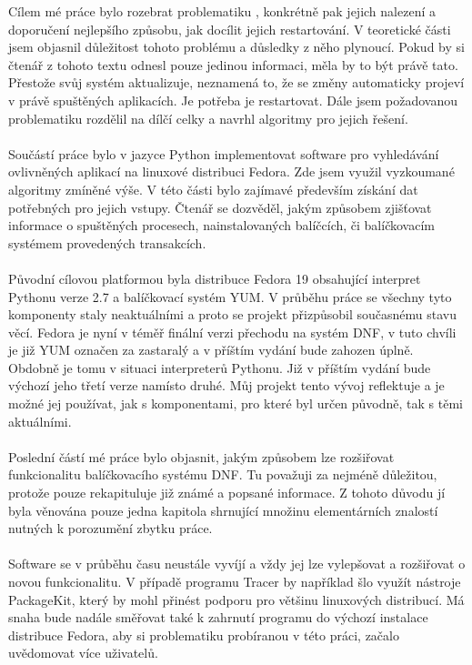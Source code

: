 \documentclass[
  field=inf,
  biblatex,
  glossaries,
  index
]{kidiplom}
\begin{document}
\begin{kiconclusions}
	Cílem mé práce bylo rozebrat problematiku , konkrétně pak jejich nalezení a doporučení nejlepšího způsobu, jak docílit jejich restartování. V teoretické části jsem objasnil důležitost tohoto problému a důsledky z něho plynoucí. Pokud by si čtenář z tohoto textu odnesl pouze jedinou informaci, měla by to být právě tato. Přestože svůj systém aktualizuje, neznamená to, že se změny automaticky projeví v právě spuštěných aplikacích. Je potřeba je restartovat. Dále jsem požadovanou problematiku rozdělil na dílčí celky a navrhl algoritmy pro jejich řešení.
	\\
	\\
	Součástí práce bylo v jazyce Python implementovat software pro vyhledávání ovlivněných aplikací na linuxové distribuci Fedora. Zde jsem využil vyzkoumané algoritmy zmíněné výše. V této části bylo zajímavé především získání dat potřebných pro jejich vstupy. Čtenář se dozvěděl, jakým způsobem zjišťovat informace o spuštěných procesech, nainstalovaných balíčcích, či balíčkovacím systémem provedených transakcích.
	\\
	\\
	Původní cílovou platformou byla distribuce Fedora 19 obsahující interpret Pythonu verze 2.7 a balíčkovací systém YUM. V průběhu práce se všechny tyto komponenty staly neaktuálními a proto se projekt přizpůsobil současnému stavu věcí. Fedora je nyní v téměř finální verzi přechodu na systém DNF, v tuto chvíli je již YUM označen za zastaralý a v příštím vydání bude zahozen úplně. Obdobně je tomu v situaci interpreterů Pythonu. Již v příštím vydání bude výchozí jeho třetí verze namísto druhé. Můj projekt tento vývoj reflektuje a je možné jej používat, jak s komponentami, pro které byl určen původně, tak s těmi aktuálními.
	\\
	\\
	Poslední částí mé práce bylo objasnit, jakým způsobem lze rozšiřovat funkcionalitu balíčkovacího systému DNF. Tu považuji za nejméně důležitou, protože pouze rekapituluje již známé a popsané informace. Z tohoto důvodu jí byla věnována pouze jedna kapitola shrnující množinu elementárních znalostí nutných k porozumění zbytku práce.
	\\
	\\
	Software se v průběhu času neustále vyvíjí a vždy jej lze vylepšovat a rozšiřovat o novou funkcionalitu. V případě programu Tracer by například šlo využít nástroje PackageKit, který by mohl přinést podporu pro většinu linuxových distribucí. Má snaha bude nadále směřovat také k zahrnutí programu do výchozí instalace distribuce Fedora, aby si problematiku probíranou v této práci, začalo uvědomovat více uživatelů.
\end{kiconclusions}
\end{document}
